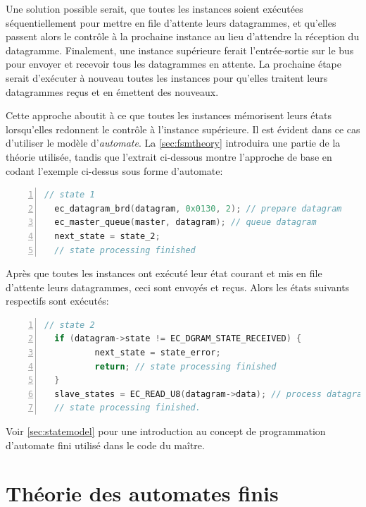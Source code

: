 \documentclass[a4paper,12pt,BCOR=6mm,bibtotoc,idxtotoc]{scrbook}
\begin{document}
Une solution possible serait, que toutes les instances soient
ex\'ecut\'ees s\'equentiellement pour mettre en file d'attente leurs
datagrammes, et qu'elles passent alors le contr\^ole \`a la prochaine
instance au lieu d'attendre la r\'eception du datagramme. Finalement,
une instance sup\'erieure ferait l'entr\'ee-sortie sur le bus pour
envoyer et recevoir tous les datagrammes en attente.  La prochaine
\'etape serait d'ex\'ecuter \`a nouveau toutes les instances pour
qu'elles traitent leurs datagrammes re\c{c}us et en \'emettent des
nouveaux.

Cette approche aboutit \`a ce que toutes les instances m\'emorisent
leurs \'etats lorsqu'elles redonnent le contr\^ole \`a l'instance
sup\'erieure.  Il est \'evident dans ce cas d'utiliser le mod\`ele
d'\textit{automate}.  La \autoref{sec:fsmtheory} introduira une partie
de la th\'eorie utilis\'ee, tandis que l'extrait ci-dessous montre
l'approche de base en codant l'exemple ci-dessus sous forme
d'automate:

\begin{lstlisting}[gobble=2,language=C,numbers=left]
  // state 1
  ec_datagram_brd(datagram, 0x0130, 2); // prepare datagram
  ec_master_queue(master, datagram); // queue datagram
  next_state = state_2;
  // state processing finished
\end{lstlisting}

Apr\`es que toutes les instances ont ex\'ecut\'e leur \'etat courant et mis en
file d'attente leurs datagrammes, ceci sont envoy\'es et re\c{c}us. Alors
les \'etats suivants respectifs sont ex\'ecut\'es:

\begin{lstlisting}[gobble=2,language=C,numbers=left]
  // state 2
  if (datagram->state != EC_DGRAM_STATE_RECEIVED) {
          next_state = state_error;
          return; // state processing finished
  }
  slave_states = EC_READ_U8(datagram->data); // process datagram
  // state processing finished.
\end{lstlisting}

Voir \autoref{sec:statemodel} pour une introduction au concept de
programmation d'automate fini utilis\'e dans le code du ma\^itre.


\section{Th\'eorie des automates finis}
\label{sec:fsmtheory}
\end{document}
